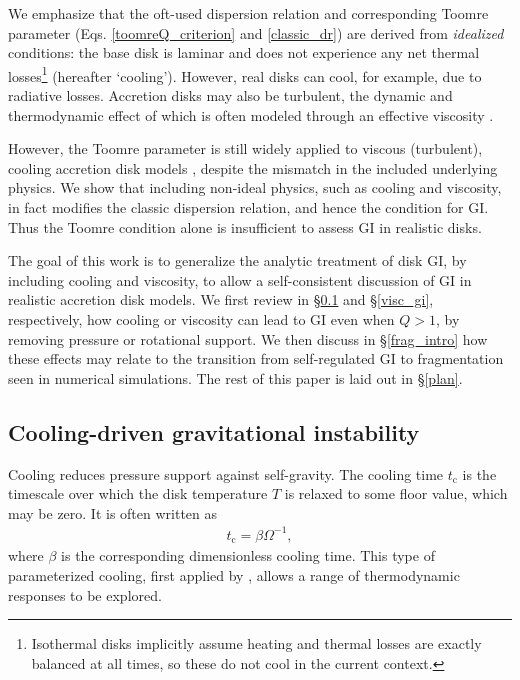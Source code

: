 \documentclass[iop, numberedappendix]{emulateapj}
\newcommand{\p}{\partial}
\newcommand{\tcool}{t_\mathrm{c}}
\begin{document}
We emphasize that the oft-used dispersion relation and corresponding
Toomre parameter (Eqs. \ref{toomreQ_criterion} and \ref{classic_dr})
are derived from \emph{idealized} conditions:  
the base disk is laminar and does not experience any net thermal 
losses\footnote{Isothermal disks implicitly assume  
  heating and thermal losses are exactly balanced at all 
  times, so these do not cool in the current context.} 
(hereafter `cooling').  
However, real disks can cool, for example, %
due to radiative losses. Accretion disks may also be turbulent, the 
dynamic and thermodynamic effect of which is often modeled through an 
effective viscosity \citep{shakura73,lin87,armitage01,rafikov15}. 

However, the Toomre parameter  
is still widely applied to viscous (turbulent), cooling
accretion disk models \citep[e.g.][]{gammie01,cossins09, kimura12}, 
despite the mismatch in the included underlying physics. 
We show that including non-ideal physics, such as cooling and
viscosity, in fact modifies the classic dispersion 
relation, and hence the condition for GI. Thus the Toomre condition
alone is insufficient to assess GI in realistic disks.  

The goal of this work is to generalize the analytic treatment of disk
GI, by including cooling and viscosity, to allow 
a self-consistent discussion of GI in realistic accretion disk
models.  
We first review in \S\ref{cool_gi} and \S\ref{visc_gi}, respectively,  
how cooling or viscosity can lead to GI even when $Q>1$, by removing
pressure or rotational support. We then 
discuss in \S\ref{frag_intro} how these effects may relate   
to the transition from self-regulated GI to fragmentation seen in
numerical simulations. The rest of this paper is laid out in
\S\ref{plan}.    



\subsection{Cooling-driven gravitational instability}\label{cool_gi}
Cooling reduces pressure support against self-gravity. The
cooling time  
$\tcool$ is the timescale over which the disk temperature $T$ is relaxed
to some floor value, which may be zero. 
 It is often written as 
\begin{align} \label{beta_def}
  \tcool = \beta \Omega^{-1},
\end{align}
where $\beta$ is the corresponding dimensionless cooling time. This
type of parameterized cooling, first applied by \cite{gammie01},
allows a range of thermodynamic responses to be explored. 
\end{document}

